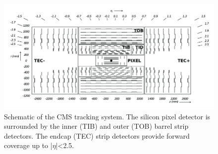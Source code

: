\begin{figure}[htb]
\centering
  \includegraphics[width=0.7\linewidth]{plots/CMS/r-z-slice-of-the-CMS-Tracker.png}
  \caption{Schematic of the CMS tracking system. The silicon pixel detector is surrounded by the inner (TIB) and outer (TOB) barrel strip detectors. The endcap (TEC) strip detectors provide forward coverage up to |$\eta$|<2.5.~ \protect\cite{CMS_tracker_diagram}}
  \label{fig:cms:tracker}
\end{figure}
